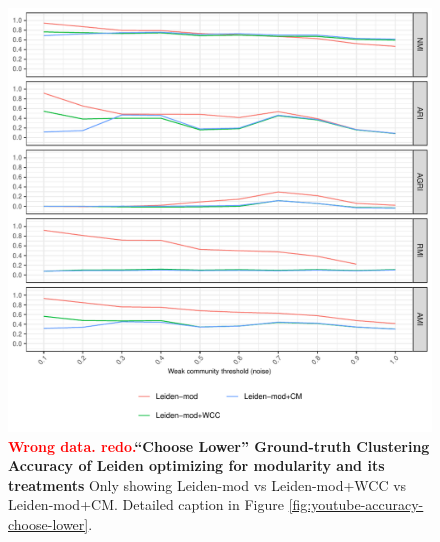 \documentclass[aps,pre,superscriptaddress]{revtex4}
\begin{document}
\begin{figure}[!htpb]
	\centering
	\includegraphics[]{figures/choose_lower_youtube_leiden_mod_accuracy.pdf}
	\caption[]{\textbf{\textcolor{red}{Wrong data. redo.}``Choose Lower'' Ground-truth Clustering Accuracy of Leiden optimizing for modularity and its treatments} Only showing Leiden-mod vs Leiden-mod+WCC vs Leiden-mod+CM. Detailed caption in Figure \ref{fig:youtube-accuracy-choose-lower}.}
	\label{fig:choose-lower-leiden-mod}
\end{figure}
\end{document}
